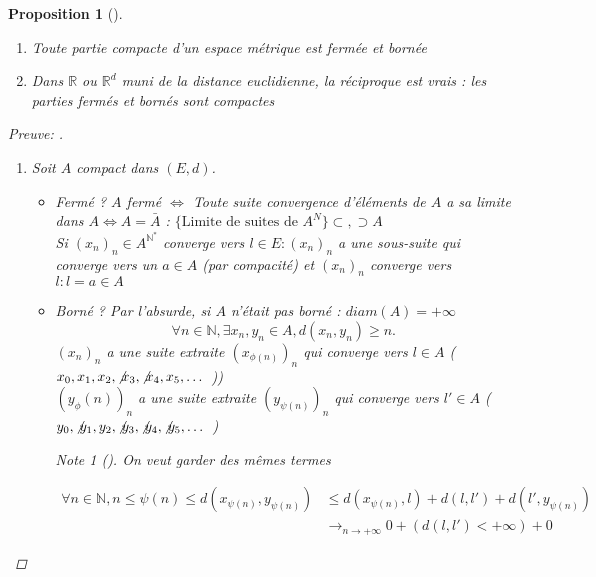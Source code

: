 \documentclass{article}
\theoremstyle{plain}%
\newtheorem{prop}[thm]{Proposition}
\theoremstyle{definition}
\theoremstyle{remark}
\newtheorem*{note}{Note}
\begin{document}
\begin{prop}[]
    \begin{enumerate}
        \item Toute partie compacte d'un espace métrique est fermée et bornée
        \item Dans $ \mathbb{R} $ ou $ \mathbb{R}^d $ muni de la distance euclidienne, la réciproque est vrais : les parties fermés et bornés sont compactes
    \end{enumerate}

    \begin{proof}[Preuve: ]
        \begin{enumerate}
            \item Soit $ A $ compact dans $ (E, d) $. \begin{itemize}
                \item Fermé ? $ A $ fermé $ \Leftrightarrow $ Toute suite convergence d'éléments de $ A $ a sa limite dans $ A \Leftrightarrow A = \bar{A}$ : $ \{\text{Limite de suites de } A^N\} \subset, \supset A $ \\
                Si $ (x_n)_n \in A^{\mathbb{N}^*} $ converge vers $ l \in E : (x_n)_n$ a une sous-suite qui converge vers un $ a \in A $ (par compacité) et $ (x_n)_n $ converge vers $ l : l = a \in A$ 
                
                \item Borné ? Par l'absurde, si $ A $ n'était pas borné : $ diam(A) = + \infty  $ 
                \[
                    \forall n \in \mathbb{N}, \exists x_n, y_n \in A, d(x_n,y_n) \geq n
                .\]
                $ (x_n)_n $ a une suite extraite $ (x_{\phi (n)})_n $ qui converge vers $ l \in A $ ($ x_0, x_1, x_2, \not x_3, \not x_4, x_5, \dots \\ $ ))\\
                $ (y_\phi (n))_n $ a une suite extraite $ (y_{\psi  (n)})_n $ qui converge vers $ l' \in A $ ( $ y_0, \not y_1, y_2, \not y_3, \not y_4, \not y_5, \dots \\ $ ) \\
                
                \begin{note}[]
                    On veut garder des mêmes termes 
                \end{note}
                \begin{align*}
                    \forall n \in \mathbb{N}, n \leq \psi (n) \leq d(x_{\psi (n)}, y_{\psi (n)}) & \leq d(x_{\psi (n)}, l) + d(l,l') + d(l', y_{\psi (n)}) \\ 
                    & \to_{n \to +\infty } 0 + (d(l,l') < +\infty) + 0
                \end{align*}
                

\end{itemize}
\end{enumerate}
\end{proof}
\end{prop}
\end{document}
